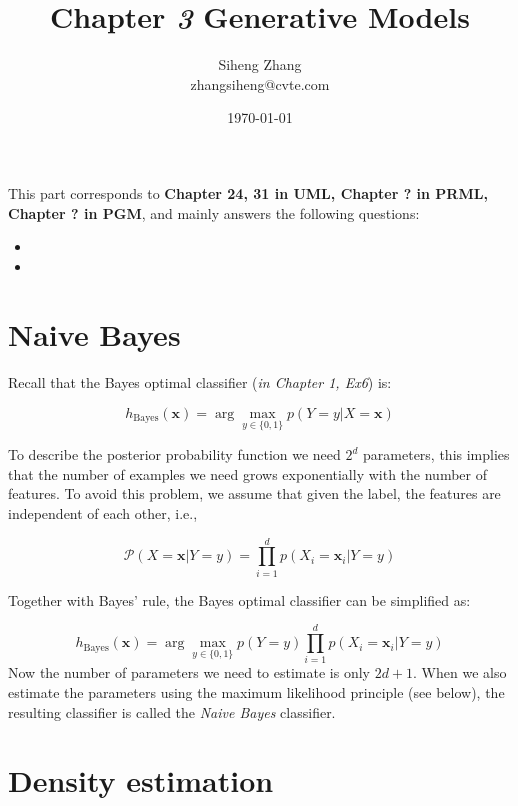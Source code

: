 \documentclass{article}
\author{Siheng Zhang\\zhangsiheng@cvte.com}
\title{Chapter \textbf{\textit{3}} Generative Models}
\date{\today}
\begin{document}
\maketitle  

This part corresponds to \textbf{Chapter 24, 31 in UML, Chapter ? in PRML, Chapter ? in PGM}, and mainly answers the following questions:

\begin{itemize}
\item 
\item 
\end{itemize}

\tableofcontents
\newpage

\section{Naive Bayes}

	Recall that the Bayes optimal classifier (\textit{in Chapter 1, Ex6}) is:
	
	\begin{equation*}
	h_{\mathrm{Bayes}}(\mathbf{x}) = \arg\max\limits_{y\in\{0,1\}} p (Y=y|X=\mathbf{x})
	\end{equation*}
	
	To describe the posterior probability function we need $2^d$ parameters, this implies that the number of examples we need grows exponentially with the number of features. To avoid this problem, we assume that given the label, the features are independent of each other, i.e., 
	
	\begin{equation*}
	\mathcal{P} (X=\mathbf{x}|Y=y) = \prod_{i=1}^d p (X_i=\mathbf{x}_i|Y=y)
	\end{equation*}
	
	Together with Bayes' rule, the Bayes optimal classifier can be simplified as:
	
	\begin{equation}
	h_{\mathrm{Bayes}}(\mathbf{x}) = \arg\max\limits_{y\in\{0,1\}} p (Y=y) \prod_{i=1}^d p (X_i=\mathbf{x}_i|Y=y)
	\end{equation}
Now the number of parameters we need to estimate is only $2d + 1$. When we also estimate the parameters using the maximum likelihood principle (see below), the resulting classifier is called the \textit{Naive Bayes} classifier.

\section{Density estimation}
\end{document}
